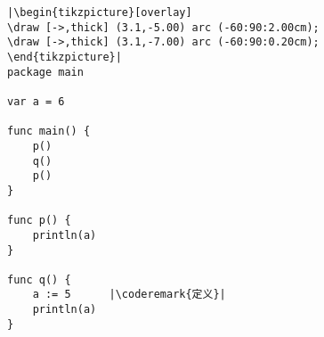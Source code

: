 \begin{lstlisting}[caption=局部作用域,label=src:scope1]
|\begin{tikzpicture}[overlay]
\draw [->,thick] (3.1,-5.00) arc (-60:90:2.00cm);
\draw [->,thick] (3.1,-7.00) arc (-60:90:0.20cm);
\end{tikzpicture}|
package main

var a = 6

func main() {
    p()
    q()
    p()
}

func p() {
    println(a)
}

func q() {
    a := 5	    |\coderemark{定义}|
    println(a)
}
\end{lstlisting}

